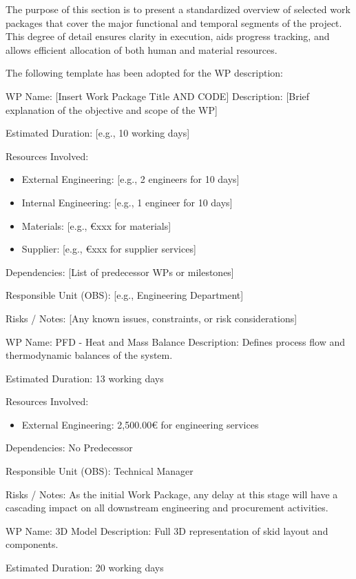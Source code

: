 The purpose of this section is to present a standardized overview of selected work packages that cover the major functional and temporal segments of the project. This degree of detail ensures clarity in execution, aids progress tracking, and allows efficient allocation of both human and material resources.

The following template has been adopted for the WP description:

WP Name: [Insert Work Package Title AND CODE]
Description:
[Brief explanation of the objective and scope of the WP]

Estimated Duration: [e.g., 10 working days]

Resources Involved:
\begin{itemize}
    \item External Engineering: [e.g., 2 engineers for 10 days]
    \item Internal Engineering: [e.g., 1 engineer for 10 days]
    \item Materials: [e.g., €xxx for materials]
    \item Supplier: [e.g., €xxx for supplier services]
\end{itemize}

Dependencies:
[List of predecessor WPs or milestones]

Responsible Unit (OBS): [e.g., Engineering Department]

Risks / Notes:
[Any known issues, constraints, or risk considerations]

WP Name: PFD - Heat and Mass Balance
Description:
Defines process flow and thermodynamic balances of the system.

Estimated Duration: 13 working days

Resources Involved:
\begin{itemize}
    \item External Engineering: 2,500.00€ for engineering services
\end{itemize}

Dependencies:
No Predecessor

Responsible Unit (OBS): Technical Manager

Risks / Notes:
As the initial Work Package, any delay at this stage will have a cascading impact on all downstream engineering and procurement activities.

WP Name: 3D Model
Description:
Full 3D representation of skid layout and components.

Estimated Duration: 20 working days


